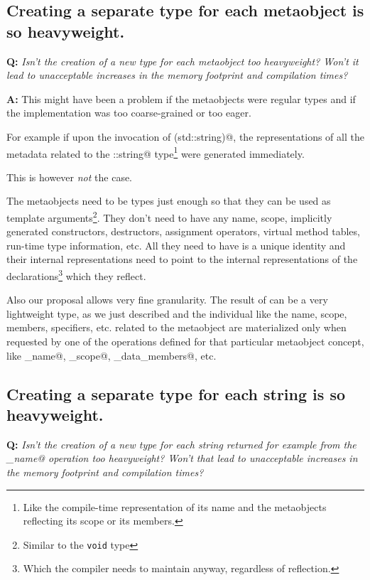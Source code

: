 \subsection{Creating a separate type for each metaobject is so heavyweight.}

\textbf{Q:} {\em Isn't the creation of a new type for each metaobject too
heavyweight? Won't it lead to unacceptable increases in the memory footprint
and compilation times?}

\textbf{A:} This might have been a problem if the metaobjects were regular
types and if the implementation was too coarse-grained or too eager.

For example if upon the invocation of \verb@reflexpr(std::string)@, the representations
of all the metadata related to the \verb@std::string@ type\footnote{Like
the compile-time representation of its name and the metaobjects reflecting its scope
or its members.} were generated immediately.

This is however {\em not} the case.

The metaobjects need to be types just enough so that they can be used
as template arguments\footnote{Similar to the \texttt{void} type}.
They don't need to have any name, scope, implicitly generated constructors,
destructors, assignment operators, virtual method tables, run-time type information,
etc. All they need to have is a unique identity and their internal representations
need to point to the internal representations of the declarations\footnote
{Which the compiler needs to maintain anyway, regardless of reflection.}
which they reflect.

Also our proposal allows very fine granularity. The result of \verb@reflexpr@
can be a very lightweight type, as we just described and the individual
 like the name, scope, members, specifiers, etc. related
to the metaobject are materialized only when requested by one of the operations
defined for that particular metaobject concept, like \verb@get_name@,
\verb@get_scope@, \verb@get_data_members@, etc.

\subsection{Creating a separate type for each string is so heavyweight.}

\textbf{Q:} {\em Isn't the creation of a new type for each string returned
for example from the \verb@get_name@ operation too heavyweight?
Won't that lead to unacceptable increases in the memory footprint
and compilation times?}

